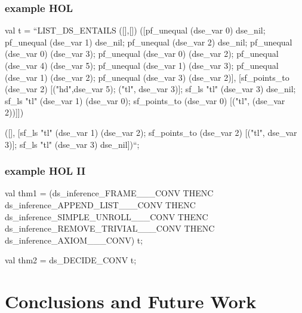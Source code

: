 \begin{frame}[fragile]
\frametitle{example HOL}
\begin{semiverbatim}\scriptsize
val t = ``LIST_DS_ENTAILS ([],[])
  ([pf_unequal (dse_var 0) dse_nil; 
    pf_unequal (dse_var 1) dse_nil;
    pf_unequal (dse_var 2) dse_nil;
    pf_unequal (dse_var 0) (dse_var 3);
    pf_unequal (dse_var 0) (dse_var 2);
    pf_unequal (dse_var 4) (dse_var 5);
    pf_unequal (dse_var 1) (dse_var 3);
    pf_unequal (dse_var 1) (dse_var 2);
    pf_unequal (dse_var 3) (dse_var 2)],
   [sf_points_to (dse_var 2) [("hd",dse_var 5); ("tl", dse_var 3)];
    sf_ls "tl" (dse_var 3) dse_nil;
    sf_ls "tl" (dse_var 1) (dse_var 0);
    sf_points_to (dse_var 0) [("tl", (dse_var 2))]])

   ([],
    [sf_ls "tl" (dse_var 1) (dse_var 2);
     sf_points_to (dse_var 2) [("tl", dse_var 3)];
     sf_ls "tl" (dse_var 3) dse_nil])``;
\end{semiverbatim}
\end{frame}

\begin{frame}[fragile]
\frametitle{example HOL II}
\begin{semiverbatim}\scriptsize
val thm1 = 
(ds_inference_FRAME___CONV THENC
 ds_inference_APPEND_LIST___CONV THENC
 ds_inference_SIMPLE_UNROLL___CONV THENC
 ds_inference_REMOVE_TRIVIAL___CONV THENC
 ds_inference_AXIOM___CONV) t;

val thm2 = ds_DECIDE_CONV t;
\end{semiverbatim}
\end{frame}

\section{Conclusions and Future Work}
\subsection*{}


